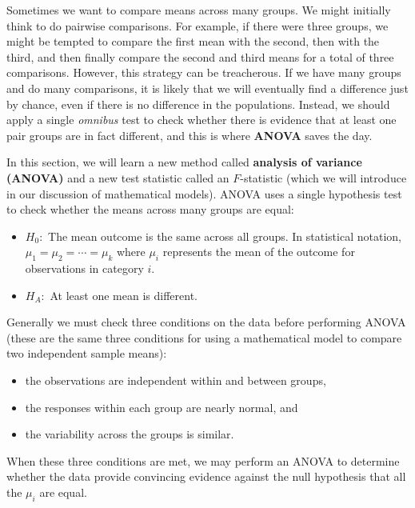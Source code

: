 \documentclass[
  10pt,
  openany]{book}
\providecommand{\tightlist}{%
  \setlength{\itemsep}{0pt}\setlength{\parskip}{0pt}}
\begin{document}

Sometimes we want to compare means across many groups.
We might initially think to do pairwise comparisons.
For example, if there were three groups, we might be tempted to compare the first mean with the second, then with the third, and then finally compare the second and third means for a total of three comparisons.
However, this strategy can be treacherous.
If we have many groups and do many comparisons, it is likely that we will eventually find a difference just by chance, even if there is no difference in the populations.
Instead, we should apply a single \emph{omnibus} test to check whether there is evidence that at least one pair groups are in fact different, and this is where \textbf{ANOVA} saves the day.

In this section, we will learn a new method called \textbf{analysis of variance (ANOVA)} and a new test statistic called an \(F\)-statistic (which we will introduce in our discussion of mathematical models).
ANOVA uses a single hypothesis test to check whether the means across many groups are equal:

\begin{itemize}
\tightlist
\item
  \(H_0:\) The mean outcome is the same across all groups. In statistical notation, \(\mu_1 = \mu_2 = \cdots = \mu_k\) where \(\mu_i\) represents the mean of the outcome for observations in category \(i.\)\\
\item
  \(H_A:\) At least one mean is different.
\end{itemize}

Generally we must check three conditions on the data before performing ANOVA (these are the same three conditions for using a mathematical model to compare two independent sample means):

\begin{itemize}
\tightlist
\item
  the observations are independent within and between groups,
\item
  the responses within each group are nearly normal, and
\item
  the variability across the groups is similar.
\end{itemize}

When these three conditions are met, we may perform an ANOVA to determine whether the data provide convincing evidence against the null hypothesis that all the \(\mu_i\) are equal.
\end{document}
